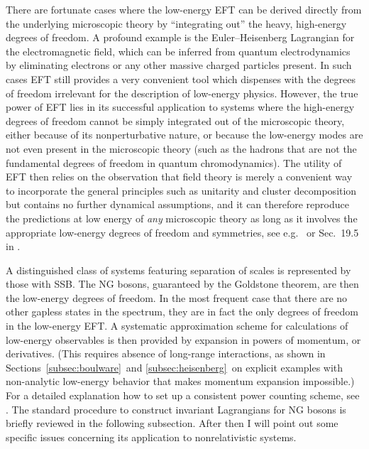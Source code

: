 \documentclass[final,3p,times,12pt,a4paper,sort&compress]{elsarticle}
\begin{document}
There are fortunate cases where the low-energy EFT can be derived directly from
the underlying microscopic theory by ``integrating out'' the heavy, high-energy
degrees of freedom. A profound example is the Euler--Heisenberg Lagrangian for
the electromagnetic field, which can be inferred from quantum electrodynamics
by eliminating electrons or any other massive charged particles present. In such
cases EFT still provides a very convenient tool which dispenses with the
degrees of freedom irrelevant for the description of low-energy physics.
However, the true power of EFT lies in its successful application to systems
where the high-energy degrees of freedom cannot be simply integrated out of the
microscopic theory, either because of its nonperturbative nature, or because
the low-energy modes are not even present in the microscopic theory (such as
the hadrons that are not the fundamental degrees of freedom in quantum
chromodynamics). The utility of EFT then relies on the observation that field
theory is merely a convenient way to incorporate the general principles such as
unitarity and cluster decomposition but contains no further dynamical
assumptions, and it can therefore reproduce the predictions at low energy of
\emph{any} microscopic theory as long as it involves the appropriate low-energy
degrees of freedom and symmetries, see e.g.~\cite{Burgess:1998ku} or Sec.~19.5
in \cite{Weinberg:1996v2}.

A distinguished class of systems featuring separation of scales is represented
by those with SSB. The NG bosons, guaranteed by the Goldstone theorem, are then
the low-energy degrees of freedom. In the most frequent case that there are no
other gapless states in the spectrum, they are in fact the only degrees of
freedom in the low-energy EFT. A systematic approximation scheme for
calculations of low-energy observables is then provided by expansion in powers
of momentum, or derivatives. (This requires absence of long-range interactions,
as shown in Sections~\ref{subsec:boulware}\ and \ref{subsec:heisenberg}\ on
explicit examples with non-analytic low-energy behavior that makes momentum
expansion impossible.) For a detailed explanation how to set up a
consistent power counting scheme, see \cite{Manohar:1996cq,Burgess:1998ku}.
The standard procedure to construct invariant Lagrangians for NG bosons
\cite{Coleman:1969sm,Callan:1969sn} is briefly reviewed in the following
subsection. After then I will point out some specific issues concerning its
application to nonrelativistic systems.
\end{document}

